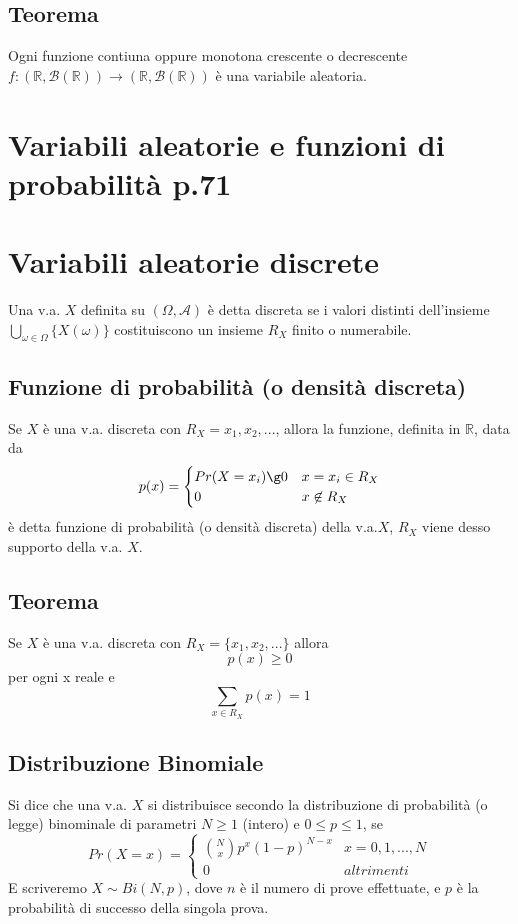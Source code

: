 \documentclass[12pt]{report}
\begin{document}
  \subsection{Teorema}
  Ogni funzione contiuna oppure monotona crescente o decrescente $f:(\mathbb{R},\mathcal{B}(\mathbb{R})) \rightarrow (\mathbb{R},\mathcal{B}(\mathbb{R})) $ è una variabile aleatoria.

  \section{Variabili aleatorie e funzioni di probabilità p.71}
  \section{Variabili aleatorie discrete}
  Una v.a. $X$ definita su $(\Omega, \mathcal{A})$ è detta discreta se i valori distinti dell'insieme $\bigcup_{\omega \in \Omega} \{ {X(\omega)} \}$ costituiscono un insieme $R_X$ finito o numerabile.

  \subsection{Funzione di probabilità (o densità discreta)}
  Se $X$ è una v.a. discreta con $R_X = {x_1,x_2,...}$, allora la funzione, definita in $\mathbb{R}$, data da
  \[
    p(x) =
      \begin{cases}
         Pr(X = x_i) \g 0 & x = x_i \in R_X \\
         0  & x \not\in R_X
      \end{cases}
  \]
  è detta funzione di probabilità (o densità discreta) della v.a.$X$, $R_X$ viene desso supporto della v.a. $X$.

  \subsection{Teorema}
  Se $X$ è una v.a. discreta con $R_X = \{ x_1,x_2,... \}$ allora
  \[ p(x) \geq 0 \] per ogni x reale e \[ \sum_{x\in R_X} p(x) = 1 \]

  \subsection{Distribuzione Binomiale}
  Si dice che una v.a. $X$ si distribuisce secondo la distribuzione di probabilità (o legge) binominale di parametri $N \geq 1$ (intero) e $0 \leq p \leq 1$, se
  \[
    Pr(X = x) =
      \begin{cases}
          \binom{N}{x}p^x(1-p)^{N-x} & x = 0, 1, ..., N \\
          0 & altrimenti
      \end{cases}
  \]
   E scriveremo $ X \sim Bi(N,p) $, dove $n$ è il numero di prove effettuate, e $p$ è la probabilità di successo della singola prova.
\end{document}
